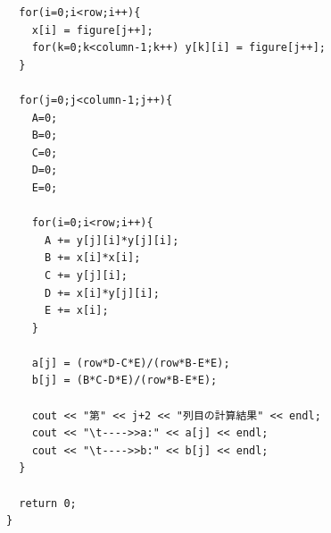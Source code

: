 \documentclass[a4j,twoside,openright,11pt]{jarticle}
\begin{document}
\begin{verbatim}
  for(i=0;i<row;i++){
	x[i] = figure[j++];
	for(k=0;k<column-1;k++) y[k][i] = figure[j++];
  }

  for(j=0;j<column-1;j++){
	A=0;
	B=0;
	C=0;
	D=0;
	E=0;

	for(i=0;i<row;i++){
	  A += y[j][i]*y[j][i];
	  B += x[i]*x[i];
	  C += y[j][i];
	  D += x[i]*y[j][i];
	  E += x[i];
	}

	a[j] = (row*D-C*E)/(row*B-E*E);
	b[j] = (B*C-D*E)/(row*B-E*E);

	cout << "第" << j+2 << "列目の計算結果" << endl;
	cout << "\t---->>a:" << a[j] << endl;
	cout << "\t---->>b:" << b[j] << endl;
  }

  return 0;
}
\end{verbatim}
\normalsize
\end{document}
